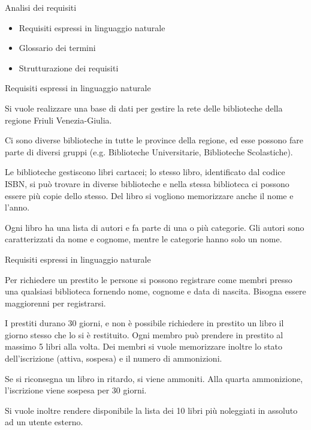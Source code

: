 \frame{\titlepage}

\begin{frame}{Analisi dei requisiti}
    \begin{itemize}
        \item Requisiti espressi in linguaggio naturale
        \item Glossario dei termini
        \item Strutturazione dei requisiti
    \end{itemize}
\end{frame}

\begin{frame}[t]{Requisiti espressi in linguaggio naturale}
    \begin{shadequote}[r]{}
        \small
        Si vuole realizzare una base di dati per gestire la rete delle biblioteche della regione Friuli Venezia-Giulia.
        
        Ci sono diverse biblioteche in tutte le province della regione, ed esse possono fare parte di diversi gruppi (e.g. Biblioteche Universitarie, Biblioteche Scolastiche).
        
        Le biblioteche gestiscono libri cartacei; lo stesso libro, identificato dal codice ISBN, si può trovare in diverse biblioteche e nella stessa biblioteca ci possono essere più copie dello stesso. Del libro si vogliono memorizzare anche il nome e l'anno.
        
        Ogni libro ha una lista di autori e fa parte di una o più categorie. Gli autori sono caratterizzati da nome e cognome, mentre le categorie hanno solo un nome.
    \end{shadequote}
\end{frame}

\begin{frame}[t]{Requisiti espressi in linguaggio naturale}
    \begin{shadequote}[r]{}
        \small
        Per richiedere un prestito le persone si possono registrare come membri presso una qualsiasi biblioteca fornendo nome, cognome e data di nascita. Bisogna essere maggiorenni per registrarsi. 

        I prestiti durano 30 giorni, e non è possibile richiedere in prestito un libro il giorno stesso che lo si è restituito. Ogni membro può prendere in prestito al massimo 5 libri alla volta. Dei membri si vuole memorizzare inoltre lo stato dell'iscrizione (attiva, sospesa) e il numero di ammonizioni.

        Se si riconsegna un libro in ritardo, si viene ammoniti. Alla quarta ammonizione, l'iscrizione viene sospesa per 30 giorni.

        Si vuole inoltre rendere disponibile la lista dei 10 libri più noleggiati in assoluto ad un utente esterno.
    \end{shadequote}
\end{frame}

